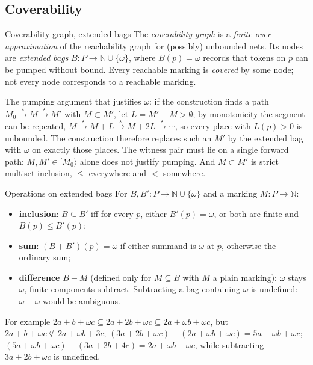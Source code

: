 \subsection{Coverability}

\begin{definitionbox}{Coverability graph, extended bags}
The \emph{coverability graph} is a \emph{finite over-approximation} of the reachability graph for (possibly) unbounded nets. Its nodes are \emph{extended bags} $B : P \to \mathbb{N} \cup \{\omega\}$, where $B(p) = \omega$ records that tokens on $p$ can be pumped without bound. Every reachable marking is \emph{covered} by some node; not every node corresponds to a reachable marking.
\end{definitionbox}

The pumping argument that justifies $\omega$: if the construction finds a path $M_0 \xrightarrow{\star} M \xrightarrow{\star} M'$ with $M \subset M'$, let $L = M' - M > \emptyset$; by monotonicity the segment can be repeated, $M \xrightarrow{\star} M + L \xrightarrow{\star} M + 2L \xrightarrow{\star} \cdots$, so every place with $L(p) > 0$ is unbounded. The construction therefore replaces such an $M'$ by the extended bag with $\omega$ on exactly those places. The witness pair must lie on a single forward path: $M, M' \in [M_0\rangle$ alone does not justify pumping. And $M \subset M'$ is strict multiset inclusion, $\leq$ everywhere and $<$ somewhere.

\begin{definitionbox}{Operations on extended bags}
For $B, B' : P \to \mathbb{N} \cup \{\omega\}$ and a marking $M : P \to \mathbb{N}$:
\begin{itemize}
  \item \textbf{inclusion}: $B \subseteq B'$ iff for every $p$, either $B'(p) = \omega$, or both are finite and $B(p) \leq B'(p)$;
  \item \textbf{sum}: $(B + B')(p) = \omega$ if either summand is $\omega$ at $p$, otherwise the ordinary sum;
  \item \textbf{difference} $B - M$ (defined only for $M \subseteq B$ with $M$ a plain marking): $\omega$ stays $\omega$, finite components subtract. Subtracting a bag containing $\omega$ is undefined: $\omega - \omega$ would be ambiguous.
\end{itemize}
For example $2a + b + \omega c \subseteq 2a + 2b + \omega c \subseteq 2a + \omega b + \omega c$, but $2a + b + \omega c \not\subseteq 2a + \omega b + 3c$; $(3a + 2b + \omega c) + (2a + \omega b + \omega c) = 5a + \omega b + \omega c$; $(5a + \omega b + \omega c) - (3a + 2b + 4c) = 2a + \omega b + \omega c$, while subtracting $3a + 2b + \omega c$ is undefined.
\end{definitionbox}

